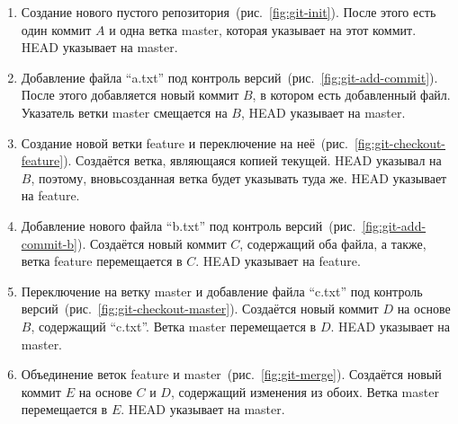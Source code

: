 \begin{enumerate}
\item Создание нового пустого репозитория~(рис.~\ref{fig:git-init}).
  После этого есть один коммит $A$ и одна ветка master, которая
  указывает на этот коммит. HEAD указывает на master.
\item Добавление файла ``a.txt'' под контроль
  версий~(рис.~\ref{fig:git-add-commit}). После этого добавляется
  новый коммит $B$, в котором есть добавленный файл. Указатель ветки
  master смещается на $B$, HEAD указывает на master.
\item Создание новой ветки feature и переключение на
  неё~(рис.~\ref{fig:git-checkout-feature}). Создаётся ветка,
  являющаяся копией текущей. HEAD указывал на $B$, поэтому,
  вновьсозданная ветка будет указывать туда же. HEAD указывает на
  feature.
\item Добавление нового файла ``b.txt'' под контроль
  версий~(рис.~\ref{fig:git-add-commit-b}). Создаётся новый коммит
  $C$, содержащий оба файла, а также, ветка feature перемещается в
  $C$. HEAD указывает на feature.
\item Переключение на ветку master и добавление файла ``c.txt'' под
  контроль версий~(рис.~\ref{fig:git-checkout-master}). Создаётся
  новый коммит $D$ на основе $B$, содержащий ``c.txt''. Ветка master
  перемещается в $D$. HEAD указывает на master.
\item Объединение веток feature и master~(рис.~\ref{fig:git-merge}).
  Создаётся новый коммит $E$ на основе $C$ и $D$, содержащий изменения
  из обоих. Ветка master перемещается в $E$. HEAD указывает на master.
\end{enumerate}

